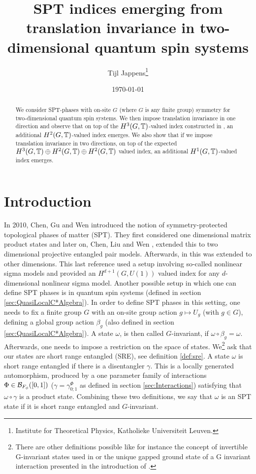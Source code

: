 \documentclass[12pt,a4paper,twoside]{article}
\title{SPT indices emerging from translation invariance in two-dimensional quantum spin systems}
\author{Tijl Jappens\footnote{Institute for Theoretical Physics, Katholieke Universiteit Leuven.}}
\date{\today}
\numberwithin{equation}{section}
\begin{document}
\maketitle 
\begin{abstract}
	We consider SPT-phases with on-site $G$ (where $G$ is any finite group) symmetry for two-dimensional quantum spin systems. We then impose translation invariance in one direction and observe that on top of the $H^3(G,\mathbb T)$-valued index constructed in \cite{ogata2021h3gmathbb}, an additional $H^2(G,\mathbb T)$-valued index emerges. We also show that if we impose translation invariance in two directions, on top of the expected $H^3(G,\mathbb T)\oplus H^2(G,\mathbb T)\oplus H^2(G,\mathbb T)$ valued index, an additional $H^1(G,\mathbb T)$-valued index emerges.
\end{abstract}
\section{Introduction}
In 2010, Chen, Gu and Wen \cite{chen_gu_wen_2011} introduced the notion of symmetry-protected topological phases of matter (SPT). They first considered one dimensional matrix product states and later on, Chen, Liu and Wen \cite{Chen_2011}, extended this to two dimensional projective entangled pair models. Afterwards, in \cite{Chen_2013} this was extended to other dimensions. This last reference used a setup involving so-called nonlinear sigma models and provided an $H^{d+1}(G,U(1))$ valued index for any $d$-dimensional nonlinear sigma model. Another possible setup in which one can define SPT phases is in quantum spin systems (defined in section \ref{sec:QuasiLocalC*Algebra}). In order to define SPT phases in this setting, one needs to fix a finite group $G$ with an on-site group action $g\mapsto U_g$ (with $g\in G$), defining a global group action $\beta_g$ (also defined in section \ref{sec:QuasiLocalC*Algebra}). A state $\omega$, is then called $G$-invariant, if $\omega\circ\beta_g=\omega$. Afterwards, one needs to impose a restriction on the space of states. We\footnote{There are other definitions possible like for instance the concept of invertible G-invariant states used in \cite{kapustin2021classification} or the unique gapped ground state of a G invariant interaction presented in the introduction of \cite{ogata2021h3gmathbb}.} ask that our states are short range entangled (SRE), see definition \ref{def:sre}. A state $\omega$ is short range entangled if there is a disentangler $\gamma$. This is a locally generated automorphism, produced by a one parameter family of interactions $\Phi\in\mathcal B_{F_\phi}([0,1])$ ($\gamma=\gamma_{0;1}^\Phi$ as defined in section \ref{sec:Interactions}) satisfying that $\omega\circ\gamma$ is a product state. Combining these two definitions, we say that $\omega$ is an SPT state if it is short range entangled and $G$-invariant.
\end{document}
